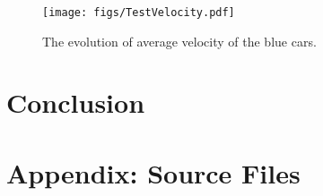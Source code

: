 \documentclass{article}
\begin{document}
\begin{figure}[h]
    \centering
    \texttt{[image: figs/TestVelocity.pdf]}
    \caption{The evolution of average velocity of the blue cars.}
    \label{fig:average_velocity}
\end{figure}


\section{Conclusion}








\pagebreak
\section*{Appendix: Source Files}
%
%
%


\end{document}
